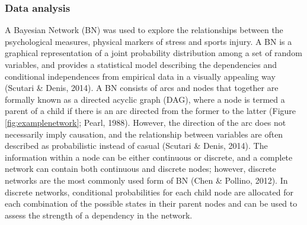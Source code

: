 \documentclass[
  english,
  man,floatsintext]{apa6}
\begin{document}
\hypertarget{data-analysis}{%
\subsubsection{Data analysis}\label{data-analysis}}

A Bayesian Network (BN) was used to explore the relationships between the psychological measures, physical markers of stress and sports injury.
A BN is a graphical representation of a joint probability distribution among a set of random variables, and provides a statistical model describing the dependencies and conditional independences from empirical data in a visually appealing way (Scutari \& Denis, 2014).
A BN consists of arcs and nodes that together are formally known as a directed acyclic graph (DAG), where a node is termed a parent of a child if there is an arc directed from the former to the latter (Figure \ref{fig:examplenetwork}; Pearl, 1988).
However, the direction of the arc does not necessarily imply causation, and the relationship between variables are often described as probabilistic instead of casual (Scutari \& Denis, 2014).
The information within a node can be either continuous or discrete, and a complete network can contain both continuous and discrete nodes; however, discrete networks are the most commonly used form of BN (Chen \& Pollino, 2012).
In discrete networks, conditional probabilities for each child node are allocated for each combination of the possible states in their parent nodes and can be used to assess the strength of a dependency in the network.
\end{document}

